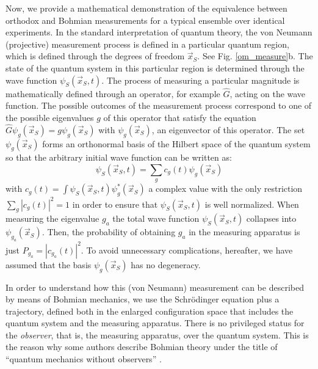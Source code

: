 \documentclass[nofootinbib, secnumarabic, amsmath, nobibnotes,11pt,aps,pra, floatfix]{revtex4-1}
\newcommand{\fref}[1]{Fig. \ref{#1}}
\begin{document}
Now, we provide a mathematical demonstration of the equivalence between orthodox and Bohmian measurements for a typical ensemble over identical experiments. In the standard interpretation of quantum theory, the von
Neumann (projective) measurement process is defined in a particular
quantum region, which is defined through the degrees of freedom
$\vec x_S$. See \fref{om_measure}b. The state of the quantum system
in this particular region is determined through the wave function
$\psi_S(\vec x_S,t)$. The process of measuring a particular
magnitude is mathematically defined through an operator, for
example $\hat{G}$, acting on the wave function. The possible
outcomes of the measurement process correspond to one of the
possible eigenvalues $g$ of this operator that satisfy the equation
$\hat{G}\psi_g(\vec x_S) = g\psi_g(\vec x_S)$ with $\psi_g(\vec
x_S)$, an eigenvector of this operator. The set $\psi_g(\vec x_S)$
forms an orthonormal basis of the Hilbert space of the quantum
system so that the arbitrary initial wave function can be written
as:\enlargethispage{1pc}
\begin{equation}
\label{om.bmeasure1}
\psi_S(\vec x_S,t) = \sum_{g} c_g(t)\psi_g(\vec x_S)
\end{equation}
with $c_g(t)=\int \psi_S(\vec x_S,t)\psi_g^*(\vec x_S) $ a complex value with the only restriction $\sum_{g}
|c_g(t)|^2 = 1$ in order to ensure that $\psi_S(\vec x_S,t)$ is well
normalized. When measuring the eigenvalue $g_a$ the total wave
function $\psi_S(\vec x_S,t)$ collapses into $\psi_{g_a}(\vec x_S)$.
Then, the probability of obtaining $g_a$ in the measuring apparatus
is just $P_{g_a} = |c_{g_a}(t)|^2$. To avoid unnecessary
complications, hereafter, we have assumed that the basis $\psi_g(\vec x_S)$ has no
degeneracy.

In order to understand how this (von Neumann) measurement can be
described by means of Bohmian mechanics, we use the Schr\"odinger
equation plus a trajectory, defined both in the enlarged
configuration space that includes the quantum system and the
measuring apparatus. There is no privileged status for the
\emph{observer}, that is, the measuring apparatus, over the quantum
system. This is the reason why some authors describe Bohmian theory
under the title of ``quantum mechanics without observers''
\cite{om.Goldsteinobserver}.
\end{document}
